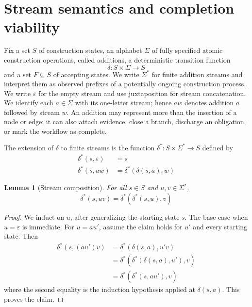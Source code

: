\documentclass[11pt]{article}
\newtheorem{lemma}[lemma]{Lemma}
\theoremstyle{definition}
\newcommand{\States}{S}
\newcommand{\Additions}{\Sigma}
\newcommand{\Accept}{F}
\newcommand{\Run}{\delta^{*}}
\newcommand{\eps}{\varepsilon}
\begin{document}
\section{Stream semantics and completion viability}\label{sec:model}

Fix a set $\States$ of construction states, an alphabet $\Additions$ of fully specified atomic construction operations, called additions, a deterministic transition function
\[
  \delta:\States\times\Additions\to\States
\]
and a set $\Accept\subseteq\States$ of accepting states. We write $\Additions^*$ for finite addition streams and interpret them as observed prefixes of a potentially ongoing construction process. We write $\eps$ for the empty stream and use juxtaposition for stream concatenation. We identify each $a\in\Additions$ with its one-letter stream; hence $aw$ denotes addition $a$ followed by stream $w$. An addition may represent more than the insertion of a node or edge; it can also attach evidence, close a branch, discharge an obligation, or mark the workflow as complete.


The extension of $\delta$ to finite streams is the function $\Run:\States\times\Additions^*\to\States$ defined by
\begin{equation}\label{eq:run}
\begin{aligned}
  \Run(s,\eps)&=s\\
  \Run(s,aw)&=\Run(\delta(s,a),w)
\end{aligned}
\end{equation}

\begin{lemma}[Stream composition]\label{lem:run-composition}
For all $s\in\States$ and $u,v\in\Additions^*$,
\begin{equation}\label{eq:run-composition}
  \Run(s,uv)=\Run(\Run(s,u),v)
\end{equation}
\end{lemma}


\begin{proof}
We induct on $u$, after generalizing the starting state $s$.
The base case when $u=\varepsilon$ is immediate. For $u=au'$, assume the claim
holds for $u'$ and every starting state. Then
\[
\begin{aligned}
\delta^*(s,(au')v)
&=\delta^*(\delta(s,a),u'v)\\
&=\delta^*(\delta^*(\delta(s,a),u'),v)\\
&=\delta^*(\delta^*(s,au'),v)
\end{aligned}
\]
where the second equality is the induction hypothesis applied at
$\delta(s,a)$. This proves the claim.
\end{proof}
\end{document}

